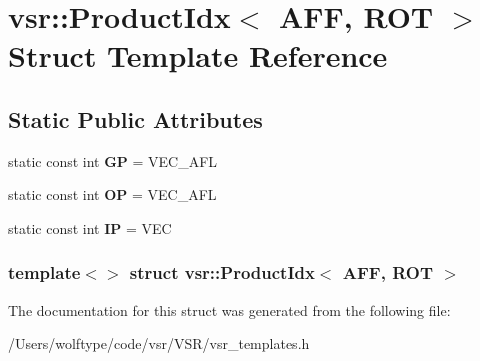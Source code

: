 \hypertarget{structvsr_1_1_product_idx_3_01_a_f_f_00_01_r_o_t_01_4}{\section{vsr\-:\-:Product\-Idx$<$ A\-F\-F, R\-O\-T $>$ Struct Template Reference}
\label{structvsr_1_1_product_idx_3_01_a_f_f_00_01_r_o_t_01_4}
}
\subsection*{Static Public Attributes}
\begin{DoxyCompactItemize}
\item 
\hypertarget{structvsr_1_1_product_idx_3_01_a_f_f_00_01_r_o_t_01_4_ae9e0dcf15f38ab3d81fb83bd816823eb}{static const int {\bfseries G\-P} = V\-E\-C\-\_\-\-A\-F\-L}\label{structvsr_1_1_product_idx_3_01_a_f_f_00_01_r_o_t_01_4_ae9e0dcf15f38ab3d81fb83bd816823eb}

\item 
\hypertarget{structvsr_1_1_product_idx_3_01_a_f_f_00_01_r_o_t_01_4_a2a111487c7e3e805228de0439978ffe8}{static const int {\bfseries O\-P} = V\-E\-C\-\_\-\-A\-F\-L}\label{structvsr_1_1_product_idx_3_01_a_f_f_00_01_r_o_t_01_4_a2a111487c7e3e805228de0439978ffe8}

\item 
\hypertarget{structvsr_1_1_product_idx_3_01_a_f_f_00_01_r_o_t_01_4_a0e2c7d807f2d96ddaae44dc5ef99084c}{static const int {\bfseries I\-P} = V\-E\-C}\label{structvsr_1_1_product_idx_3_01_a_f_f_00_01_r_o_t_01_4_a0e2c7d807f2d96ddaae44dc5ef99084c}

\end{DoxyCompactItemize}
\subsubsection*{template$<$$>$ struct vsr\-::\-Product\-Idx$<$ A\-F\-F, R\-O\-T $>$}



The documentation for this struct was generated from the following file\-:\begin{DoxyCompactItemize}
\item 
/\-Users/wolftype/code/vsr/\-V\-S\-R/vsr\-\_\-templates.\-h\end{DoxyCompactItemize}

